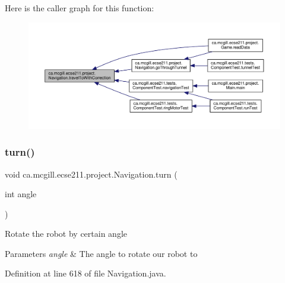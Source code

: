 Here is the caller graph for this function\+:
\nopagebreak
\begin{figure}[H]
\begin{center}
\leavevmode
\includegraphics[width=350pt]{classca_1_1mcgill_1_1ecse211_1_1project_1_1_navigation_ae7230e905494002087416294f12cae6a_icgraph}
\end{center}
\end{figure}
\mbox{\label{classca_1_1mcgill_1_1ecse211_1_1project_1_1_navigation_ad74286ad36d333bfaf57661837457b76}} 
\subsubsection{\texorpdfstring{turn()}{turn()}}
{\footnotesize\ttfamily void ca.\+mcgill.\+ecse211.\+project.\+Navigation.\+turn (\begin{DoxyParamCaption}\item[{int}]{angle }\end{DoxyParamCaption})}

Rotate the robot by certain angle


\begin{DoxyParams}{Parameters}
{\em angle} & The angle to rotate our robot to \\
\hline
\end{DoxyParams}


Definition at line 618 of file Navigation.\+java.


